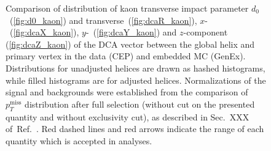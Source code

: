 \begin{figure}[ht]
{  \begin{subfigure}[b]{\linewidth}\addtocounter{subfigure}{1}
  \end{subfigure}
  \begin{minipage}[t][1.042\linewidth][t]{\linewidth}\vspace{10pt}
    \caption[Comparison of distribution of kaon $d_{0}$ and components of DCA vector in the data and embedded MC, before and after adjustment of TPC pointing resolution.]
    {Comparison of distribution of kaon transverse impact parameter $d_{0}$~(\ref{fig:d0_kaon}) and transverse~(\ref{fig:dcaR_kaon}), $x$-~(\ref{fig:dcaX_kaon}), $y$-~(\ref{fig:dcaY_kaon}) and $z$-component (\ref{fig:dcaZ_kaon}) of the DCA vector between the global helix and primary vertex in the data (CEP) and embedded MC (GenEx). Distributions for unadjusted helices are drawn as hashed histograms, while filled histograms are for adjusted helices. Normalizations of the signal and backgrounds were established from the comparison of $p_{T}^{\textrm{miss}}$ distribution after full selection (without cut on the presented quantity and without exclusivity cut), as described in Sec.~XXX of~Ref.~\cite{AnalysisNoteRafal}. Red dashed lines and red arrows indicate the range of each quantity which is accepted in analyses.}\label{fig:pointingResComp_kaon}
  \end{minipage}
}%

\end{figure}
